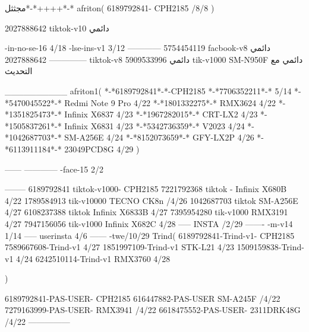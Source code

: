 مجثثل*-*++++*-*
afriton(
6189792841- CPH2185  /8/8
)

2027888642 tiktok-v10
دائمي

-in-no-se-16 4/18
-lse-ins-v1 3/12
------------
5754454119 facbook-v8
دائمي
--------------
2027888642 tiktok-v8
دائمي
5909533996 tik-v1000  SM-N950F
دائمي مع التحديث

__________
afriton1(
*-*6189792841*-*-CPH2185
*-*7706352211*-* 5/14
*-*5470045522*-* Redmi Note 9 Pro 4/22
*-*1801332275*-* RMX3624 4/22
*-*1351825473*-* Infinix X6837 4/23
*-*1967282015*-* CRT-LX2 4/23
*-*1505837261*-* Infinix X6831 4/23
*-*5342736359*-* V2023 4/24
*-*1042687703*-* SM-A256E 4/24
*-*8152073659*-* GFY-LX2P 4/26
*-*6113911184*-* 23049PCD8G 4/29
)


------
------------
-face-15 2/2

--------
6189792841 tiktok-v1000- CPH2185 
7221792368 tiktok - Infinix X680B  4/22 
1789584913 tik-v10000 TECNO CK8n /4/26
1042687703 tiktok SM-A256E 4/27
6108237388 tiktok  Infinix X6833B 4/27
7395954280 tik-v1000  RMX3191 4/27
7947156056 tik-v1000  Infinix X682C 4/28
-----
 INSTA /2/29
-------
-m-v14 1/14
-----
userinsta 4/6
------
-twe/10/29
Trind(
6189792841-Trind-v1- CPH2185 
7589667608-Trind-v1  4/27
1851997109-Trind-v1 STK-L21 4/23
1509159838-Trind-v1  4/24
6242510114-Trind-v1 RMX3760 4/28

)

6189792841-PAS-USER- CPH2185 
616447882-PAS-USER SM-A245F /4/22
7279163999-PAS-USER- RMX3941 /4/22
6618475552-PAS-USER- 2311DRK48G /4/22
    ---------------
